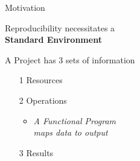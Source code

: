 \documentclass{beamer}
\begin{document}
\begin{frame}{Motivation}
\begin{minipage}{0.6\textwidth}

\begin{center} Reproducibility necessitates a\\ \textbf{Standard Environment}\end{center} 
\bigskip

A Project has 3 sets of information
\bigskip
	
\begin{itemize}
\item[1] Resources
\item[2] Operations
\begin{small}
\begin{itemize}
\item \emph{A Functional Program \\ maps data to output}
\end{itemize}
\end{small}
\item[3] Results
\end{itemize}


\end{minipage}
\end{frame}
\end{document}

